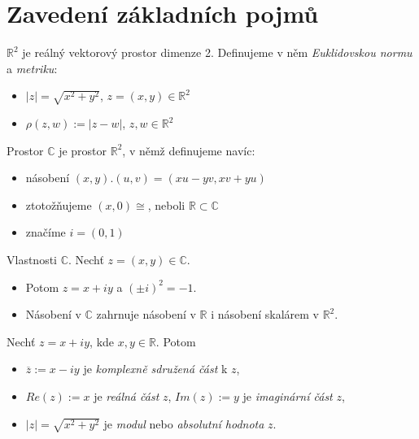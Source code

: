 \section{\texorpdfstring{Zavedení základních pojmů}{Lg}}
\vspace{5mm}
\large


\textbf{$\mathbb{R}^2$} je reálný vektorový prostor dimenze 2. Definujeme v něm \emph{Euklidovskou normu} a \emph{metriku}:
\begin{itemize}
    \item $|z| = \sqrt{x^2+y^2}$, $z = (x,y)\in\mathbb{R}^2$
    \item $\rho(z,w):= |z-w|$, $z,w\in\mathbb{R}^2$
\end{itemize}

\begin{definition}
Prostor $\mathbb{C}$ je prostor $\mathbb{R}^2$, v němž definujeme navíc:
\begin{itemize}
    \item násobení $(x,y).(u,v) = (xu-yv, xv+yu)$
    \item ztotožňujeme $(x,0) \cong$, neboli $\mathbb{R}\subset\mathbb{C}$
    \item značíme $i = (0,1)$
\end{itemize}
\end{definition}

\begin{properties}
Vlastnosti $\mathbb{C}$. Nechť $z = (x,y)\in\mathbb{C}$.
\begin{itemize}
    \item Potom $z = x+iy$ a $(\pm i)^2 = -1$.
    \item Násobení v $\mathbb{C}$ zahrnuje násobení v $\mathbb{R}$ i násobení skalárem v $\mathbb{R}^2$.
\end{itemize}
\end{properties}


\begin{notation}
Nechť $z = x+iy$, kde $x,y\in\mathbb{R}$. Potom
\begin{itemize}
    \item $\overline{z}:= x-iy$ je \textit{komplexně sdružená část} k $z$,
    \item $Re(z):= x$ je \textit{reálná část} $z$, $Im(z):= y$ je \textit{imaginární část} $z$,
    \item $|z| = \sqrt{x^2+y^2}$ je \textit{modul} nebo \textit{absolutní hodnota} $z$.
\end{itemize}
\end{notation} 

